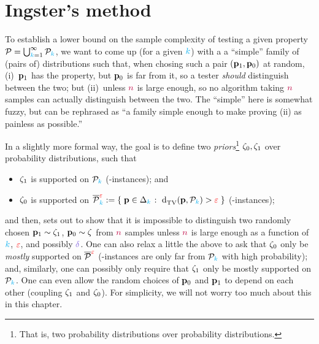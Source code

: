 
\section{Ingster's method}

To establish a lower bound on the sample complexity of testing a given property $\mathcal{P} = \bigcup_{{\textcolor{cyan}{k}}=1}^\infty \mathcal{P}_{\textcolor{cyan}{k}}$, we want to come up (for a given ${\textcolor{cyan}{k}}$) with a a ``simple'' family of (pairs of) distributions such that, when chosing such a pair $(\mathbf{p}_1, \mathbf{p}_0)$ at random, (i)~$\mathbf{p}_1$ has the property, but $\mathbf{p}_0$ is far from it, so a tester \emph{should} distinguish between the two; but (ii)~unless ${\textcolor{purple}{n}}$ is large enough, so no algorithm taking ${\textcolor{purple}{n}}$ samples can actually distinguish between the two. The ``simple'' here is somewhat fuzzy, but can be rephrased as ``a family simple enough to make proving (ii) as painless as possible.''

In a slightly more formal way, the goal is to define two \emph{priors}\footnote{That is, two probability distributions over probability distributions.} $\zeta_0,\zeta_1$ over probability distributions, such that
\begin{itemize}
	\item $\zeta_1$ is supported on $\mathcal{P}_{\textcolor{cyan}{k}}$ (\yes-instances); and
	\item $\zeta_0$ is supported on $\overline{\property}^{\dst}_\ab \eqdef \setOfSuchThat{\p\in\distribs{\ab}}{\totalvardist{\p}{\property_\ab}>\dst}$ (\no-instances);
\end{itemize}
and then, sets out to show that it is impossible to distinguish two randomly chosen $\mathbf{p}_1\sim \zeta_1$, $\mathbf{p}_0\sim \zeta$ from ${\textcolor{purple}{n}}$ samples unless ${\textcolor{purple}{n}}$ is large enough as a function of ${\textcolor{cyan}{k}}$, $\textcolor{red}{\varepsilon}$, and possibly $\errprob$. One can also relax a little the above to ask that $\zeta_0$ only be \emph{mostly} supported on $\overline{\mathcal{P}}^{\textcolor{red}{\varepsilon}}$ (\ie \no-instances are only far from $\mathcal{P}_{\textcolor{cyan}{k}}$ with high probability); and, similarly, one can possibly only require that $\zeta_1$ only be mostly supported on $\mathcal{P}_{\textcolor{cyan}{k}}$. One can even allow the random choices of $\mathbf{p}_0$ and $\mathbf{p}_1$ to depend on each other (\ie coupling $\zeta_1$ and $\zeta_0$). For simplicity, we will not worry too much about this in this chapter.\medskip

